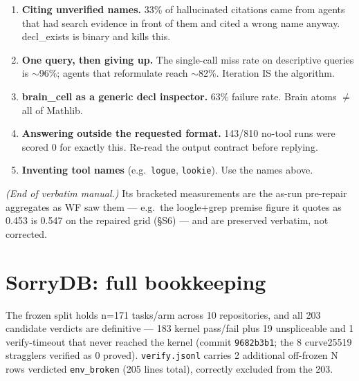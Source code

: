 \documentclass[10pt]{article}
\newcommand{\code}[1]{\texttt{#1}}
\begin{document}

\begin{enumerate}
\item \textbf{Citing unverified names.} 33\% of hallucinated citations
  came from agents that had search evidence in front of them and cited
  a wrong name anyway. decl\_exists is binary and kills this.
\item \textbf{One query, then giving up.} The single-call miss rate on
  descriptive queries is $\sim$96\%; agents that reformulate reach
  $\sim$82\%. Iteration IS the algorithm.
\item \textbf{brain\_cell as a generic decl inspector.} 63\% failure
  rate. Brain atoms $\neq$ all of Mathlib.
\item \textbf{Answering outside the requested format.} 143/810 no-tool
  runs were scored 0 for exactly this. Re-read the output contract
  before replying.
\item \textbf{Inventing tool names} (e.g.\ \code{logue},
  \code{lookie}). Use the names above.
\end{enumerate}
\endgroup

\medskip\noindent
\emph{(End of verbatim manual.)} Its bracketed measurements are the
as-run pre-repair aggregates as WF saw them --- e.g.\ the loogle+grep
premise figure it quotes as 0.453 is 0.547 on the repaired grid
(\S S6) --- and are preserved verbatim, not corrected.

\section{SorryDB: full bookkeeping}\label{s9}

The frozen split holds n=171 tasks/arm across 10 repositories, and all
203 candidate verdicts are definitive --- 183 kernel pass/fail plus 19
unspliceable and 1 verify-timeout that never reached the kernel
(commit \code{9682b3b1}; the 8 curve25519 stragglers verified as 0
proved). \code{verify.jsonl} carries 2 additional off-frozen N rows
verdicted \code{env\_broken} (205 lines total), correctly excluded
from the 203.
\end{document}
